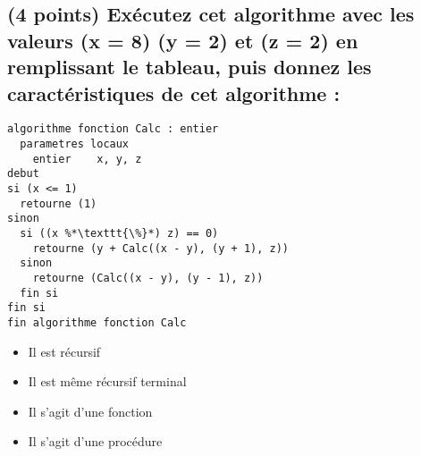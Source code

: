 \documentclass[11pt,a4paper]{article}
\begin{document}


\subsection{(4 points) Exécutez cet algorithme avec les valeurs (x = 8) (y = 2) et (z = 2) en remplissant le tableau, puis donnez les caractéristiques de cet algorithme : }


\begin{table}[!ht]
  \centering
  \begin{minipage}{0.645\textwidth}
    \centering

\begin{lstlisting}[style=algorithmique]
algorithme fonction Calc : entier
  parametres locaux
    entier    x, y, z
debut
si (x <= 1)
  retourne (1)
sinon
  si ((x %*\texttt{\%}*) z) == 0)
    retourne (y + Calc((x - y), (y + 1), z))
  sinon
    retourne (Calc((x - y), (y - 1), z))
  fin si
fin si
fin algorithme fonction Calc \end{lstlisting}

\begin{itemize}
  \item[\checkmark] Il est récursif  \phantom{Lg}\\
  \item[\CaseCoche] Il est même récursif terminal  \phantom{Lg}\\
  \item[\checkmark] Il s'agit d'une fonction  \phantom{Lg}\\
  \item[\CaseCoche] Il s'agit d'une procédure  \phantom{Lg}\\
\end{itemize}


  \end{minipage}
  \hfillx
  \begin{minipage}{0.33\textwidth}
    \centering


\end{minipage}
\end{table}
\end{document}
